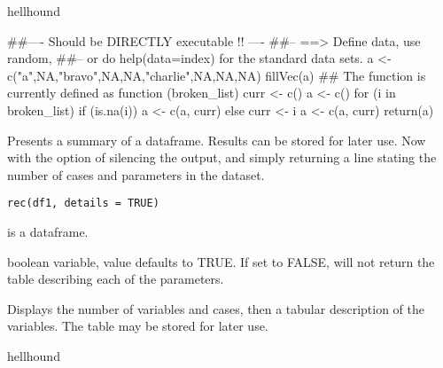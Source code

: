 \documentclass[letterpaper]{book}
\begin{document}
%
\begin{Author}\relax
hellhound
\end{Author}
%
\begin{Examples}
\begin{ExampleCode}
##---- Should be DIRECTLY executable !! ----
##-- ==>  Define data, use random,
##--	or do  help(data=index)  for the standard data sets.
a <- c("a",NA,"bravo",NA,NA,"charlie",NA,NA,NA)
fillVec(a)
## The function is currently defined as
function (broken_list) 
{
    curr <- c()
    a <- c()
    for (i in broken_list) {
        if (is.na(i)) {
            a <- c(a, curr)
        }
        else {
            curr <- i
            a <- c(a, curr)
        }
    }
    return(a)
  }
\end{ExampleCode}
\end{Examples}
%
\begin{Description}\relax
Presents a summary of a dataframe. Results can be stored for later use. Now with the option of silencing the output, and simply returning a line stating the number of cases and parameters in the dataset. 
\end{Description}
%
\begin{Usage}
\begin{verbatim}
rec(df1, details = TRUE)
\end{verbatim}
\end{Usage}
%
\begin{Arguments}
\begin{ldescription}
\item[\code{df1}] 
is a dataframe. 

\item[\code{details}] 
boolean variable, value defaults to TRUE. If set to FALSE, will not return the table describing each of the parameters. 

\end{ldescription}
\end{Arguments}
%
\begin{Value}
Displays the number of variables and cases, then a tabular description of the variables. The table may be stored for later use. 
\end{Value}
%
\begin{Author}\relax
hellhound
\end{Author}
%
\end{document}
